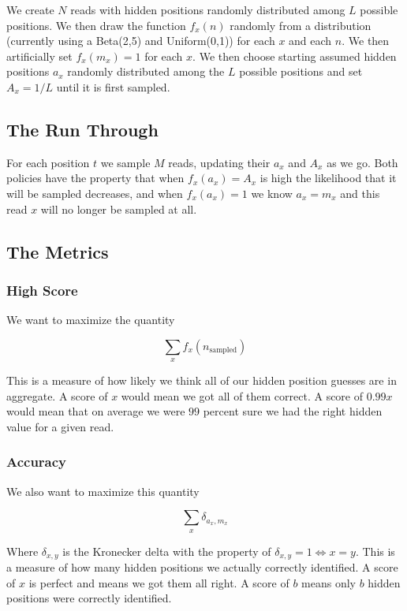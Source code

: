 \documentclass[phd,tocprelim]{cornell}
\begin{document}
We create $N$ reads with hidden positions randomly distributed among $L$ possible positions. We then draw the function $f_{x}(n)$ randomly from a distribution (currently using a Beta(2,5) and Uniform(0,1)) for each $x$ and each $n$. We then artificially set $f_{x}(m_{x}) = 1$ for each $x$. We then choose starting assumed hidden positions $a_{x}$ randomly distributed among the $L$ possible positions and set $A_{x} = 1/L$ until it is first sampled.

\subsection{The Run Through}

For each position $t$ we sample $M$ reads, updating their $a_{x}$ and $A_{x}$ as we go. Both policies have the property that when $f_{x}(a_{x}) = A_{x}$ is high the likelihood that it will be sampled decreases, and when $f_{x}(a_{x}) = 1$ we know $a_{x} = m_{x}$ and this read $x$ will no longer be sampled at all.

\subsection{The Metrics}

\subsubsection{High Score}

We want to maximize the quantity

\[\sum_{x} f_{x}(n_{\mbox{sampled}})\]

This is a measure of how likely we think all of our hidden position guesses are in aggregate. A score of $x$ would mean we got all of them correct. A score of $0.99x$ would mean that on average we were $99$ percent sure we had the right hidden value for a given read.

\subsubsection{Accuracy}

We also want to maximize this quantity

\[\sum_{x} \delta_{a_{x},m_{x}}\]

Where $\delta_{x,y}$ is the Kronecker delta with the property of $\delta_{x,y} = 1 \Longleftrightarrow x = y$. This is a measure of how many hidden positions we actually correctly identified. A score of $x$ is perfect and means we got them all right. A score of $b$ means only $b$ hidden positions were correctly identified.
\end{document}

